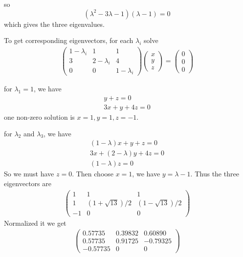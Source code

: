 \documentclass[11pt]{article}
\begin{document}
so
\begin{equation*}
(\lambda^2-3\lambda-1)(\lambda-1) = 0
\end{equation*}
which gives the three eigenvalues.

To get corresponding eigenvectors, for each $\lambda_i$ solve
\begin{eqnarray*}
\begin{pmatrix}
1-\lambda_i & 1 & 1 \\ 3 & 2-\lambda_i &4 \\ 0 & 0 &1-\lambda_i
\end{pmatrix}
\begin{pmatrix}
x \\ y \\ z
\end{pmatrix} = 
\begin{pmatrix}
0 \\ 0 \\ 0
\end{pmatrix} 
\end{eqnarray*}

for $\lambda_1 = 1$, we have
\begin{eqnarray*}
y+z = 0 \\ 3 x + y + 4z = 0 
\end{eqnarray*}
one non-zero solution is $ x=1, y=1, z=-1 $. 

for $\lambda_2$ and $\lambda_3$, we have
\begin{eqnarray*}
(1-\lambda)x + y+z = 0 \\ 3 x + (2-\lambda)y + 4z = 0 \\ (1-\lambda) z =0 
\end{eqnarray*}
So we must have $z=0$. Then choose $x=1$, we have $y=\lambda-1$. Thus the three eigenvectors are
\begin{eqnarray*}
\begin{pmatrix}
1  & 1  & 1 \\ 
1  & (1+\sqrt{13})/2 & (1-\sqrt{13})/2 \\ 
-1 & 0 & 0
\end{pmatrix}
\end{eqnarray*}
Normalized it we get
\begin{eqnarray*}
\begin{pmatrix}
0.57735 & 0.39832 & 0.60890 \\
0.57735 & 0.91725 & -0.79325 \\
-0.57735 & 0 & 0
\end{pmatrix}
\end{eqnarray*}
\end{document}
